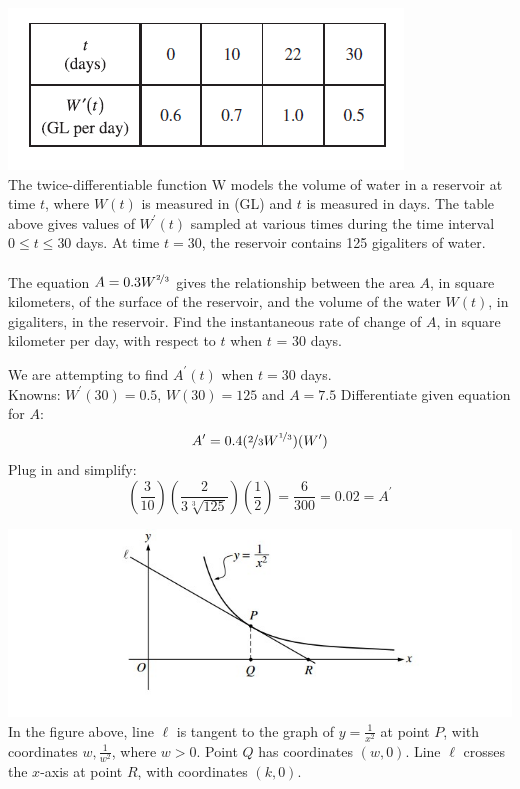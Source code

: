 \documentclass[12pt,letterpaper, onecolumn]{exam}
\begin{document}
\begin{questions}
		\question 
		\question \includegraphics[width=0.5\linewidth]{Question08-001}\\
		The twice-differentiable function W models the volume of water in a reservoir at time $t$, where $W(t)$ is measured in (GL) and $t$ is measured in days. The table above gives values of $W^{\prime}(t)$ sampled at various times during the time interval $0 \leq t \leq 30$ days. At time $t = 30$, the reservoir contains 125 gigaliters of water. \\ \\
		The equation $A = 0.3W^{\nicefrac{2}{3}}$ gives the relationship between the area $A$, in square kilometers, of the surface of the reservoir, and the volume of the water $W(t)$, in gigaliters, in the reservoir. Find the instantaneous rate of change of $A$, in square kilometer per day, with respect to $t$ when $t$ = 30 days.
		\begin{solution}
			We are attempting to find $A^{\prime}(t)$ when $t=30$ days. \\
			Knowns: $W^\prime(30) = 0.5$, $W(30)=125$ and $A=7.5$
			Differentiate given equation for $A$:
			$$A^{\prime} = 0.4(\nicefrac{2}{3}W^{\nicefrac{1}{3}})(W^{\prime})$$
			Plug in and simplify:
			$$\left( \frac{3}{10}\right) \left( \frac{2}{3 \sqrt[3]{125}}\right) \left( \frac{1}{2}\right)  = \frac{6}{300} = \boxed{0.02 = A^{\prime}}$$
		\end{solution}
		\question 
		\includegraphics{Question09-001} \\
		In the figure above, line $\ell$ is tangent to the graph of $y = \frac{1}{x^2}$ at point $P$, with coordinates $w,\frac{1}{w^2}$, where $w > 0$. Point $Q$ has coordinates $(w, 0)$. Line $\ell$ crosses the $x$-axis at point $R$, with coordinates $(k, 0)$.
			\begin{parts}

\end{parts}
\end{questions}
\end{document}
